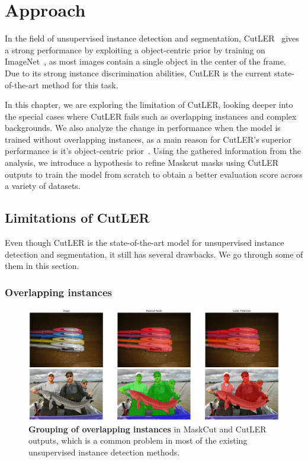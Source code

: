 \chapter{Approach}\label{chap:approach}

In the field of unsupervised instance detection and segmentation, CutLER~\cite{wang2023cut} gives a strong performance by exploiting a  object-centric prior by training on ImageNet~\cite{deng2009imagenet}, as most images contain a single
object in the center of the frame.  Due to its strong instance discrimination abilities, CutLER is the current state-of-the-art method for this task.

In this chapter, we are exploring the limitation of CutLER, looking deeper into the special cases where CutLER fails such as overlapping instances and complex backgrounds. We also analyze the change in performance when the model is trained without overlapping instances, as a main reason for CutLER's superior  performance is it's object-centric prior~\cite{engstler2023understanding}. Using the gathered information from the analysis, we introduce a hypothesis to refine Maskcut masks using CutLER outputs to train the model from scratch to obtain a better evaluation score across a variety of datasets.

\section{Limitations of CutLER}
Even though CutLER is the state-of-the-art model for unsupervised instance detection and segmentation, it still has several drawbacks. We go through some of them in this section.

\subsection{Overlapping instances}
\begin{figure}
	\centering
	\includegraphics[width=1\textwidth]{Images/main/cutler-prob-overlap.png}
	\caption[\textbf{Cutler performance on images with overlapping instances}]{\textbf{Grouping of overlapping instances} in MaskCut and CutLER outputs, which is a common problem in most of the existing unsupervised instance detection methods.}
	\label{fig:cutler_overlapping_instances_eg}
\end{figure}

